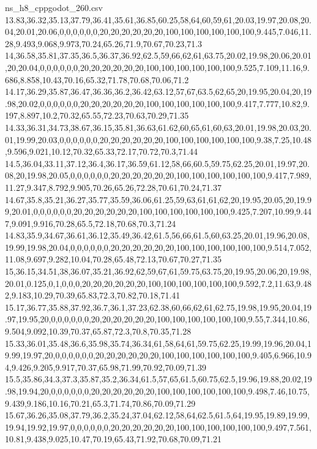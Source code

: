 \begin{filecontents*}[overwrite]{ns_h8_cppgodot_260.csv}
13.83,36.32,35.13,37.79,36.41,35.61,36.85,60.25,58,64,60,59,61,20.03,19.97,20.08,20.04,20.01,20.06,0,0,0,0,0,0,20,20,20,20,20,20,100,100,100,100,100,100,9.445,7.046,11.28,9.493,9.068,9.973,70.24,65.26,71.9,70.67,70.23,71.3
14,36.58,35.81,37.35,36.5,36.37,36.92,62.5,59,66,62,61,63.75,20.02,19.98,20.06,20.01,20,20.04,0,0,0,0,0,0,20,20,20,20,20,20,100,100,100,100,100,100,9.525,7.109,11.16,9.686,8.858,10.43,70.16,65.32,71.78,70.68,70.06,71.2
14.17,36.29,35.87,36.47,36.36,36.2,36.42,63.12,57,67,63.5,62,65,20,19.95,20.04,20,19.98,20.02,0,0,0,0,0,0,20,20,20,20,20,20,100,100,100,100,100,100,9.417,7.777,10.82,9.197,8.897,10.2,70.32,65.55,72.23,70.63,70.29,71.35
14.33,36.31,34.73,38.67,36.15,35.81,36.63,61.62,60,65,61,60,63,20.01,19.98,20.03,20.01,19.99,20.03,0,0,0,0,0,0,20,20,20,20,20,20,100,100,100,100,100,100,9.38,7.25,10.48,9.596,9.021,10.12,70.32,65.33,72.17,70.72,70.3,71.44
14.5,36.04,33.11,37.12,36.4,36.17,36.59,61.12,58,66,60.5,59.75,62.25,20.01,19.97,20.08,20,19.98,20.05,0,0,0,0,0,0,20,20,20,20,20,20,100,100,100,100,100,100,9.417,7.989,11.27,9.347,8.792,9.905,70.26,65.26,72.28,70.61,70.24,71.37
14.67,35.8,35.21,36.27,35.77,35.59,36.06,61.25,59,63,61,61,62,20,19.95,20.05,20,19.99,20.01,0,0,0,0,0,0,20,20,20,20,20,20,100,100,100,100,100,100,9.425,7.207,10.99,9.447,9.091,9.916,70.28,65.5,72.18,70.68,70.3,71.24
14.83,35.9,34.67,36.61,36.12,35.49,36.42,61.5,56,66,61.5,60,63.25,20.01,19.96,20.08,19.99,19.98,20.04,0,0,0,0,0,0,20,20,20,20,20,20,100,100,100,100,100,100,9.514,7.052,11.08,9.697,9.282,10.04,70.28,65.48,72.13,70.67,70.27,71.35
15,36.15,34.51,38,36.07,35.21,36.92,62,59,67,61,59.75,63.75,20,19.95,20.06,20,19.98,20.01,0.125,0,1,0,0,0,20,20,20,20,20,20,100,100,100,100,100,100,9.592,7.2,11.63,9.482,9.183,10.29,70.39,65.83,72.3,70.82,70.18,71.41
15.17,36.77,35.88,37.92,36.7,36.1,37.23,62.38,60,66,62,61,62.75,19.98,19.95,20.04,19.97,19.95,20,0,0,0,0,0,0,20,20,20,20,20,20,100,100,100,100,100,100,9.55,7.344,10.86,9.504,9.092,10.39,70.37,65.87,72.3,70.8,70.35,71.28
15.33,36.01,35.48,36.6,35.98,35.74,36.34,61,58,64,61,59.75,62.25,19.99,19.96,20.04,19.99,19.97,20,0,0,0,0,0,0,20,20,20,20,20,20,100,100,100,100,100,100,9.405,6.966,10.94,9.426,9.205,9.917,70.37,65.98,71.99,70.92,70.09,71.39
15.5,35.86,34.3,37.3,35.87,35.2,36.34,61.5,57,65,61.5,60.75,62.5,19.96,19.88,20.02,19.98,19.94,20,0,0,0,0,0,0,20,20,20,20,20,20,100,100,100,100,100,100,9.498,7.46,10.75,9.439,9.186,10.16,70.21,65.3,71.74,70.86,70.09,71.29
15.67,36.26,35.08,37.79,36.2,35.24,37.04,62.12,58,64,62.5,61.5,64,19.95,19.89,19.99,19.94,19.92,19.97,0,0,0,0,0,0,20,20,20,20,20,20,100,100,100,100,100,100,9.497,7.561,10.81,9.438,9.025,10.47,70.19,65.43,71.92,70.68,70.09,71.21

\end{filecontents*}
